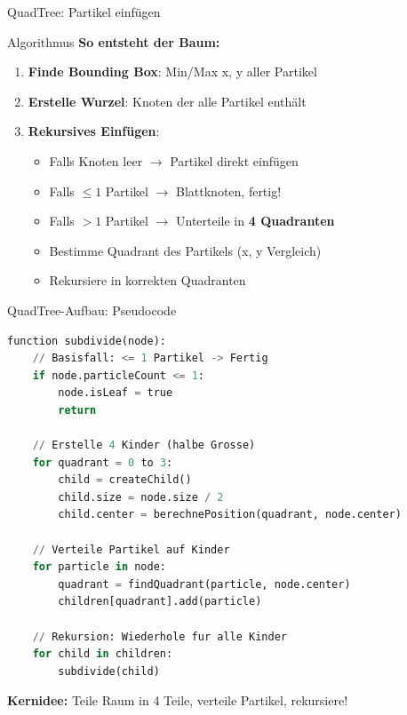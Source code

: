\documentclass[xcolor=dvipsnames]{beamer}
\begin{document}
\begin{frame}{QuadTree: Partikel einfügen}
\begin{block}{Algorithmus}
\textbf{So entsteht der Baum:}
\end{block}

\begin{enumerate}
    \item \textbf{Finde Bounding Box}: Min/Max x, y aller Partikel
    \item \textbf{Erstelle Wurzel}: Knoten der alle Partikel enthält
    \item \textbf{Rekursives Einfügen}:
    \begin{itemize}
        \item Falls Knoten leer $\rightarrow$ Partikel direkt einfügen
        \item Falls $\leq 1$ Partikel $\rightarrow$ Blattknoten, fertig!
        \item Falls $> 1$ Partikel $\rightarrow$ Unterteile in \textbf{4 Quadranten}
        \item Bestimme Quadrant des Partikels (x, y Vergleich)
        \item Rekursiere in korrekten Quadranten
    \end{itemize}
\end{enumerate}
\end{frame}

\begin{frame}[fragile]{QuadTree-Aufbau: Pseudocode}
\begin{lstlisting}[language=Python, basicstyle=\footnotesize\ttfamily]
function subdivide(node):
    // Basisfall: <= 1 Partikel -> Fertig
    if node.particleCount <= 1:
        node.isLeaf = true
        return

    // Erstelle 4 Kinder (halbe Grosse)
    for quadrant = 0 to 3:
        child = createChild()
        child.size = node.size / 2
        child.center = berechnePosition(quadrant, node.center)

    // Verteile Partikel auf Kinder
    for particle in node:
        quadrant = findQuadrant(particle, node.center)
        children[quadrant].add(particle)

    // Rekursion: Wiederhole fur alle Kinder
    for child in children:
        subdivide(child)
\end{lstlisting}

\textbf{Kernidee:} Teile Raum in 4 Teile, verteile Partikel, rekursiere!
\end{frame}
\end{document}
